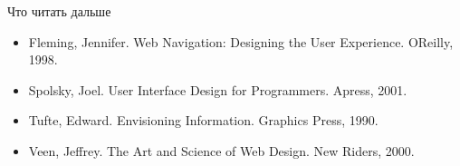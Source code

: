 \documentclass{beamer}
\begin{document}
\begin{frame}[t]{Что читать дальше}
\begin{itemize}
\item Fleming, Jennifer. Web Navigation: Designing the User Experience. OReilly, 1998.
\item Spolsky, Joel. User Interface Design for Programmers. Apress, 2001.
\item Tufte, Edward. Envisioning Information. Graphics Press, 1990.
\item Veen, Jeffrey. The Art and Science of Web Design. New Riders, 2000.
\end{itemize}
\end{frame}
\end{document}
